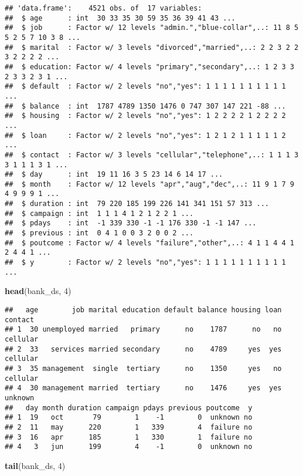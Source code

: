 \documentclass[]{article}
\newenvironment{Shaded}{\begin{snugshade}}{\end{snugshade}}
\newcommand{\DecValTok}[1]{\textcolor[rgb]{0.00,0.00,0.81}{#1}}
\newcommand{\KeywordTok}[1]{\textcolor[rgb]{0.13,0.29,0.53}{\textbf{#1}}}
\newcommand{\NormalTok}[1]{#1}
\begin{document}
\begin{verbatim}
## 'data.frame':    4521 obs. of  17 variables:
##  $ age      : int  30 33 35 30 59 35 36 39 41 43 ...
##  $ job      : Factor w/ 12 levels "admin.","blue-collar",..: 11 8 5 5 2 5 7 10 3 8 ...
##  $ marital  : Factor w/ 3 levels "divorced","married",..: 2 2 3 2 2 3 2 2 2 2 ...
##  $ education: Factor w/ 4 levels "primary","secondary",..: 1 2 3 3 2 3 3 2 3 1 ...
##  $ default  : Factor w/ 2 levels "no","yes": 1 1 1 1 1 1 1 1 1 1 ...
##  $ balance  : int  1787 4789 1350 1476 0 747 307 147 221 -88 ...
##  $ housing  : Factor w/ 2 levels "no","yes": 1 2 2 2 2 1 2 2 2 2 ...
##  $ loan     : Factor w/ 2 levels "no","yes": 1 2 1 2 1 1 1 1 1 2 ...
##  $ contact  : Factor w/ 3 levels "cellular","telephone",..: 1 1 1 3 3 1 1 1 3 1 ...
##  $ day      : int  19 11 16 3 5 23 14 6 14 17 ...
##  $ month    : Factor w/ 12 levels "apr","aug","dec",..: 11 9 1 7 9 4 9 9 9 1 ...
##  $ duration : int  79 220 185 199 226 141 341 151 57 313 ...
##  $ campaign : int  1 1 1 4 1 2 1 2 2 1 ...
##  $ pdays    : int  -1 339 330 -1 -1 176 330 -1 -1 147 ...
##  $ previous : int  0 4 1 0 0 3 2 0 0 2 ...
##  $ poutcome : Factor w/ 4 levels "failure","other",..: 4 1 1 4 4 1 2 4 4 1 ...
##  $ y        : Factor w/ 2 levels "no","yes": 1 1 1 1 1 1 1 1 1 1 ...
\end{verbatim}

\begin{Shaded}
\begin{Highlighting}[]
\KeywordTok{head}\NormalTok{(bank_ds, }\DecValTok{4}\NormalTok{)}
\end{Highlighting}
\end{Shaded}

\begin{verbatim}
##   age        job marital education default balance housing loan  contact
## 1  30 unemployed married   primary      no    1787      no   no cellular
## 2  33   services married secondary      no    4789     yes  yes cellular
## 3  35 management  single  tertiary      no    1350     yes   no cellular
## 4  30 management married  tertiary      no    1476     yes  yes  unknown
##   day month duration campaign pdays previous poutcome  y
## 1  19   oct       79        1    -1        0  unknown no
## 2  11   may      220        1   339        4  failure no
## 3  16   apr      185        1   330        1  failure no
## 4   3   jun      199        4    -1        0  unknown no
\end{verbatim}

\begin{Shaded}
\begin{Highlighting}[]
\KeywordTok{tail}\NormalTok{(bank_ds, }\DecValTok{4}\NormalTok{)}
\end{Highlighting}
\end{Shaded}
\end{document}
